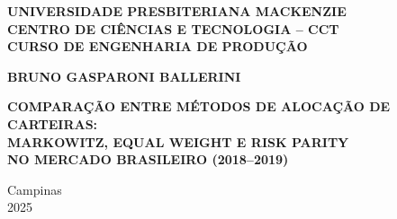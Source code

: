 
\thispagestyle{empty}

\begin{center}

\vspace*{3cm}

{\fontsize{12}{14.4}\selectfont\bfseries\MakeUppercase{UNIVERSIDADE PRESBITERIANA MACKENZIE}}\\[0.8cm]
{\fontsize{12}{14.4}\selectfont\bfseries\MakeUppercase{Centro de Ciências e Tecnologia – CCT}}\\[0.5cm]
{\fontsize{12}{14.4}\selectfont\bfseries\MakeUppercase{Curso de Engenharia de Produção}}

\vspace{5cm}

{\fontsize{12}{14.4}\selectfont\bfseries\MakeUppercase{BRUNO GASPARONI BALLERINI}}

\vspace{5cm}

{\fontsize{12}{14.4}\selectfont\bfseries\MakeUppercase{%
COMPARAÇÃO ENTRE MÉTODOS DE ALOCAÇÃO DE CARTEIRAS:\\[0.3cm]
MARKOWITZ, EQUAL WEIGHT E RISK PARITY\\[0.3cm] 
NO MERCADO BRASILEIRO (2018–2019)%
}}

\vfill

{\fontsize{12}{14.4}\selectfont
Campinas\\[0.3cm]
2025}

\end{center}